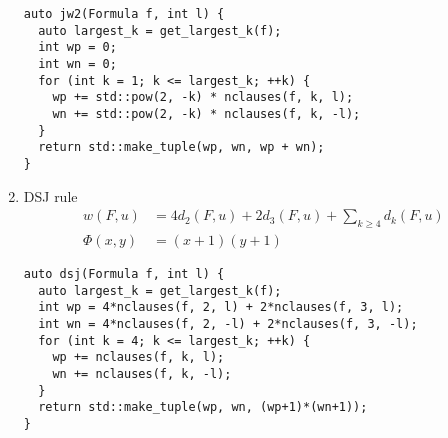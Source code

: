 \documentclass[10pt,AMS Euler]{article}
\begin{document}
\begin{enumerate}
\begin{verbatim}
auto jw2(Formula f, int l) {
  auto largest_k = get_largest_k(f);
  int wp = 0;
  int wn = 0;
  for (int k = 1; k <= largest_k; ++k) {
    wp += std::pow(2, -k) * nclauses(f, k, l);
    wn += std::pow(2, -k) * nclauses(f, k, -l);
  }
  return std::make_tuple(wp, wn, wp + wn);
}
\end{verbatim}
\item DSJ rule
\label{sec:org194d25d}
\begin{align*}
w(F,u) &= 4d_2(F,u) + 2d_3(F,u) + \sum_{k\geq 4} d_k(F,u) \\
\Phi(x,y) &= (x+1)(y+1)
\end{align*}
\begin{verbatim}
auto dsj(Formula f, int l) {
  auto largest_k = get_largest_k(f);
  int wp = 4*nclauses(f, 2, l) + 2*nclauses(f, 3, l);
  int wn = 4*nclauses(f, 2, -l) + 2*nclauses(f, 3, -l);
  for (int k = 4; k <= largest_k; ++k) {
    wp += nclauses(f, k, l);
    wn += nclauses(f, k, -l);
  }
  return std::make_tuple(wp, wn, (wp+1)*(wn+1));
}
\end{verbatim}
\end{enumerate}
\end{document}
